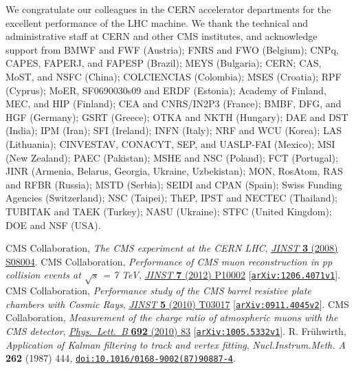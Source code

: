 \documentclass{JINST}
\begin{document}
\acknowledgments
We congratulate our colleagues in the CERN accelerator departments for the excellent performance of the LHC machine. We thank the technical and administrative staff at CERN and other CMS institutes, and acknowledge support from BMWF and FWF (Austria); FNRS and FWO (Belgium); CNPq, CAPES, FAPERJ, and FAPESP (Brazil); MEYS (Bulgaria); CERN; CAS, MoST, and NSFC (China); COLCIENCIAS (Colombia); MSES (Croatia); RPF (Cyprus); MoER, SF0690030s09 and ERDF (Estonia); Academy of Finland, MEC, and HIP (Finland); CEA and CNRS/IN2P3 (France); BMBF, DFG, and HGF (Germany); GSRT (Greece); OTKA and NKTH (Hungary); DAE and DST (India); IPM (Iran); SFI (Ireland); INFN (Italy); NRF and WCU (Korea); LAS (Lithuania); CINVESTAV, CONACYT, SEP, and UASLP-FAI (Mexico); MSI (New Zealand); PAEC (Pakistan); MSHE and NSC (Poland); FCT (Portugal); JINR (Armenia, Belarus, Georgia, Ukraine, Uzbekistan); MON, RosAtom, RAS and RFBR (Russia); MSTD (Serbia); SEIDI and CPAN (Spain); Swiss Funding Agencies (Switzerland); NSC (Taipei); ThEP, IPST and NECTEC (Thailand); TUBITAK and TAEK (Turkey); NASU (Ukraine); STFC (United Kingdom); DOE and NSF (USA).

\begin{thebibliography}{99}

CMS Collaboration, \emph{The CMS experiment at the CERN LHC},
\href{http://iopscience.iop.org/1748-0221/3/08/S08004}{\emph{JINST} {\bf 3} (2008) S08004}.
CMS Collaboration, \emph{Performance of CMS muon reconstruction in pp collision events at $\sqrt{s}$ = 7 TeV},
\href{http://iopscience.iop.org/1748-0221/7/10/P10002}{\emph{JINST} {\bf 7} (2012) P10002}
[\href{http://arXiv.org/abs/arXiv:1206.4071}{\tt arXiv:1206.4071v1}]. %
CMS Collaboration, \emph{Performance study of the CMS barrel resistive plate chambers with Cosmic Rays},
\href{http://dx.doi.org/10.1088/1748-0221/5/03/T03017}{\emph{JINST} {\bf 5} (2010) T03017} [\href{http://arxiv.org/abs/0911.4045v2}{\tt arXiv:0911.4045v2}]. %
CMS Collaboration, \emph{Measurement of the charge ratio of atmospheric muons with the CMS detector},
\href{http://dx.doi.org/10.1016/j.physletb.2010.07.033}
{\emph{Phys.\ Lett.\ B} {\bf 692} (2010) 83} [\href{http://arxiv.org/abs/1005.5332v1}{\tt arXiv:1005.5332v1}]. %
R. Fr{\"{u}}hwirth, \emph{Application of Kalman filtering to track and vertex fitting},
{\emph{Nucl.Instrum.Meth. A} {\bf 262} (1987) 444}, \href{http://dx.doi.org/10.1016/0168-9002(87)90887-4}{\tt doi:10.1016/0168-9002(87)90887-4}.

\end{thebibliography}
\end{document}
